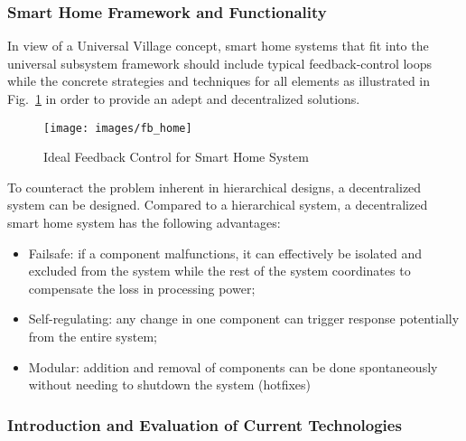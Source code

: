 \documentclass[letterpaper, twocolumn, 10pt, conference]{IEEEtran}
\begin{document}
\subsubsection{Smart Home Framework and Functionality}
\label{sssec:zcy:smart_home:framework}


In view of a Universal Village concept, smart home systems that fit into the universal subsystem framework should include typical feedback-control loops while the concrete strategies and techniques for all elements as illustrated in Fig.~\ref{fig:jz:smart_home_feedback} in order to provide an adept and  decentralized solutions.



\begin{figure}[h!]
        \centering
        \texttt{[image: images/fb\_home]}
        \caption{Ideal Feedback Control for Smart Home System}
        \label{fig:jz:smart_home_feedback}
\end{figure}

To counteract the problem inherent in hierarchical designs, a decentralized system can be designed. Compared to a hierarchical system, a decentralized smart home system has the following advantages:

\begin{itemize}
        \item Failsafe: if a component malfunctions, it can effectively be isolated and excluded from the system while the rest of the system coordinates to compensate the loss in processing power;
        \item Self-regulating: any change in one component can trigger response potentially from the entire system;
        \item Modular: addition and removal of components can be done spontaneously without needing to shutdown the system (hotfixes)
\end{itemize}




\subsubsection{Introduction and Evaluation of Current Technologies}
\label{sssec:zcy:smart_home:evaluation}
\end{document}
